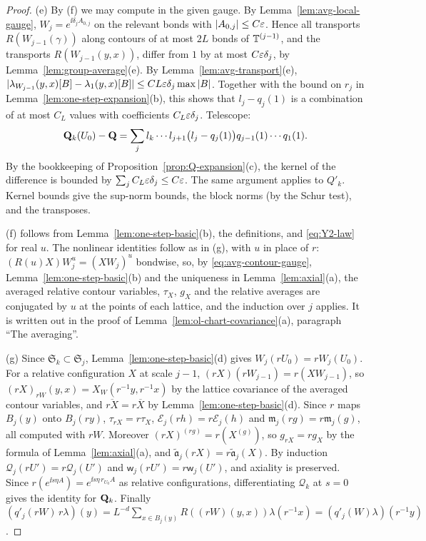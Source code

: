 \begin{proof}
(e) By (f) we may compute in the given gauge. By Lemma~\ref{lem:avg-local-gauge}, $W_{j}=e^{\ii\delta_jA_{0,j}}$ on the relevant bonds with $|A_{0,j}|\le C\varepsilon$. Hence all transports $R(W_{j-1}(\gamma))$ along contours of at most $2L$ bonds of $\mathbb T^{(j-1)}$, and the transports $R(W_{j-1}(y,x))$, differ from $1$ by at most $C\varepsilon\delta_j$, by Lemma~\ref{lem:group-average}(e). By Lemma~\ref{lem:avg-transport}(e), $|\lambda_{W_{j-1}}(y,x)[B]-\lambda_1(y,x)[B]|\le CL\varepsilon\delta_j\max|B|$. Together with the bound on $r_j$ in Lemma~\ref{lem:one-step-expansion}(b), this shows that $l_j-q_j(1)$ is a combination of at most $C_L$ values with coefficients $C_L\varepsilon\delta_j$. Telescope:
\[
\mathbf Q_k(U_0)-\mathbf Q=\sum_jl_k\cdots l_{j+1}\big(l_j-q_j(1)\big)q_{j-1}(1)\cdots q_1(1).
\]
By the bookkeeping of Proposition~\ref{prop:Q-expansion}(c), the kernel of the difference is bounded by $\sum_jC_L\varepsilon\delta_j\le C\varepsilon$. The same argument applies to $Q'_k$. Kernel bounds give the sup-norm bounds, the block norms (by the Schur test), and the transposes.

(f) follows from Lemma~\ref{lem:one-step-basic}(b), the definitions, and \eqref{eq:Y2-law} for real $u$. The nonlinear identities follow as in (g), with $u$ in place of $r$: $(R(u)X)W_j^u=(XW_j)^u$ bondwise, so, by \eqref{eq:avg-contour-gauge}, Lemma~\ref{lem:one-step-basic}(b) and the uniqueness in Lemma~\ref{lem:axial}(a), the averaged relative contour variables, $\tau_X$, $g_X$ and the relative averages are conjugated by $u$ at the points of each lattice, and the induction over $j$ applies. It is written out in the proof of Lemma~\ref{lem:ol-chart-covariance}(a), paragraph ``The averaging''.

(g) Since $\mathfrak S_k\subset\mathfrak S_j$, Lemma~\ref{lem:one-step-basic}(d) gives $W_j(rU_0)=rW_j(U_0)$. For a relative configuration $X$ at scale $j-1$, $(rX)(rW_{j-1})=r(XW_{j-1})$, so $(rX)_{rW}(y,x)=X_W(r^{-1}y,r^{-1}x)$ by the lattice covariance of the averaged contour variables, and $\overline{rX}=r\overline X$ by Lemma~\ref{lem:one-step-basic}(d). Since $r$ maps $B_j(y)$ onto $B_j(ry)$, $\tau_{rX}=r\tau_X$, $\mathcal E_j(rh)=r\mathcal E_j(h)$ and $\mathfrak m_j(rg)=r\mathfrak m_j(g)$, all computed with $rW$. Moreover $(rX)^{(rg)}=r(X^{(g)})$, so $g_{rX}=rg_X$ by the formula of Lemma~\ref{lem:axial}(a), and $\tilde{\mathfrak a}_j(rX)=r\tilde{\mathfrak a}_j(X)$. By induction $\mathcal Q_j(rU')=r\mathcal Q_j(U')$ and $\mathsf w_j(rU')=r\mathsf w_j(U')$, and axiality is preserved. Since $r(e^{\ii s\eta A})=e^{\ii s\eta\,r_{U_0}A}$ as relative configurations, differentiating $\mathcal Q_k$ at $s=0$ gives the identity for $\mathbf Q_k$. Finally $(q'_j(rW)\,r\lambda)(y)=L^{-d}\sum_{x\in B_j(y)}R((rW)(y,x))\lambda(r^{-1}x)=(q'_j(W)\lambda)(r^{-1}y)$.
\end{proof}

